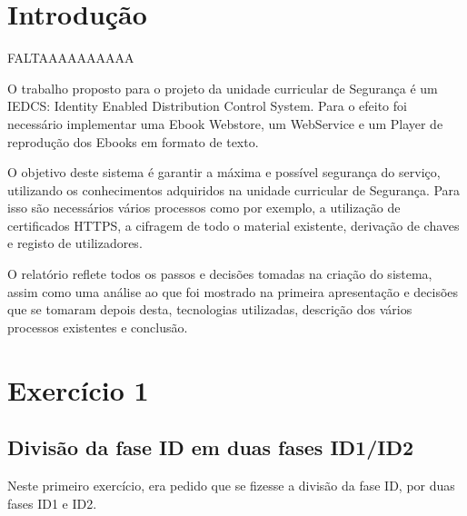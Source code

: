 \documentclass[pdftex,12pt,a4paper]{report}
\begin{document}
\renewcommand{\headrulewidth}{0pt}

\fancyhead{}
\fancyfoot{}
\rfoot{\thepage}

\renewcommand*\contentsname{Conteúdos}
\renewcommand*\figurename{Figura}
\renewcommand*\tablename{Tabela}

\tableofcontents
\renewcommand{\headrulewidth}{0.15pt}
\renewcommand{\thechapter}{}

\clearpage

\section{Introdução}

FALTAAAAAAAAAA

O trabalho proposto para o projeto da unidade curricular de Segurança é um IEDCS: Identity Enabled Distribution Control System. Para o  efeito foi necessário implementar uma Ebook Webstore, um WebService e um Player de reprodução dos Ebooks em formato de texto.

O objetivo deste sistema é garantir a máxima e possível segurança do serviço, utilizando os conhecimentos adquiridos na unidade curricular de Segurança. Para isso são necessários vários processos como por exemplo, a utilização de certificados HTTPS, a cifragem de todo o material existente, derivação de chaves e registo de utilizadores.	

O relatório reflete todos os passos e decisões tomadas na criação do sistema, assim como uma análise ao que foi mostrado na primeira apresentação e decisões que se tomaram depois desta, tecnologias utilizadas, descrição dos vários processos existentes e conclusão.

\newpage
\section{Exercício 1}

\subsection{Divisão da fase ID em duas fases ID1/ID2}
Neste primeiro exercício, era pedido que se fizesse a divisão da fase ID, por duas fases ID1 e ID2.
\end{document}
